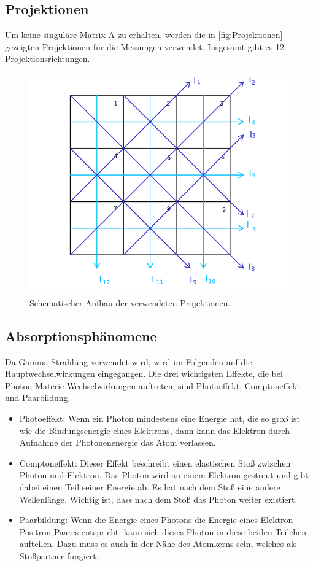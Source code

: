 \subsection{Projektionen}
Um keine singuläre Matrix A zu erhalten, werden die in \autoref{fig:Projektionen} gezeigten Projektionen für die Messungen verwendet.
Insgesamt gibt es 12 Projektionsrichtungen.

\begin{figure}[H]
    \centering
    \includegraphics[width=\textwidth]{bilder/projektionen.png}
    \caption{Schematischer Aufbau der verwendeten Projektionen.}
    \label{fig:Projektionen}
\end{figure}

\subsection{Absorptionsphänomene}
Da Gamma-Strahlung verwendet wird, wird im Folgenden auf die Hauptwechselwirkungen eingegangen.
Die drei wichtigsten Effekte, die bei Photon-Materie Wechselwirkungen auftreten, sind Photoeffekt, Comptoneffekt und Paarbildung.
\begin{itemize}
    \item   Photoeffekt: Wenn ein Photon mindestens eine Energie hat, die so groß ist wie die Bindungsenergie eines Elektrons, dann kann das Elektron durch Aufnahme der Photonenenergie das Atom verlassen.
    
    \item   Comptoneffekt: Dieser Effekt beschreibt einen elastischen Stoß zwischen Photon und Elektron.
            Das Photon wird an einem Elektron gestreut und gibt dabei einen Teil seiner Energie ab.
            Es hat nach dem Stoß eine andere Wellenlänge. Wichtig ist, dass nach dem Stoß das Photon weiter existiert.
    
    \item   Paarbildung: Wenn die Energie eines Photons die Energie eines Elektron-Positron Paares entspricht, kann sich dieses Photon in diese beiden Teilchen aufteilen.
            Dazu muss es auch in der Nähe des Atomkerns sein, welches als Stoßpartner fungiert. 
    
\end{itemize}

